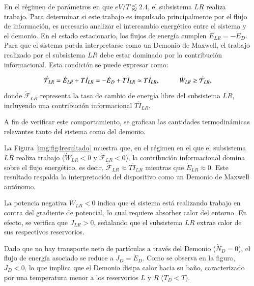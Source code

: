 
En el régimen de parámetros en que \( eV/T \lessapprox 2.4 \), el subsistema \( LR \) realiza trabajo. Para determinar si este trabajo es impulsado principalmente por el flujo de información, es necesario analizar el intercambio energético entre el sistema y el demonio. En el estado estacionario, los flujos de energía cumplen $\dot{E}_{LR}= -\dot{E}_{D}$. Para que el sistema pueda interpretarse como un Demonio de Maxwell, el trabajo realizado por el subsistema \( LR \) debe estar dominado por la contribución informacional. Esta condición se puede expresar como:

\[
\dot{\mathcal{F}}_{LR} = \dot{E}_{LR} + T\dot{I}_{LR} = -\dot{E}_{D} + T\dot{I}_{LR} \approx T\dot{I}_{LR}, \hspace{10mm} \dot{W}_{LR} \geq \dot{\mathcal{F}}_{LR},
\]

donde \( \dot{\mathcal{F}}_{LR} \) representa la tasa de cambio de energía libre del subsistema \( LR \), incluyendo una contribución informacional \( T\dot{I}_{LR} \).

A fin de verificar este comportamiento, se grafican las cantidades termodinámicas relevantes tanto del sistema como del demonio.



La Figura \ref{img:fig4resultado} muestra que, en el régimen en el que el subsistema $LR$ realiza trabajo ($\dot{W}_{LR} < 0$ y $\dot{\mathcal{F}}_{LR} < 0$), la contribución informacional domina sobre el flujo energético, es decir, $\dot{\mathcal{F}}_{LR} \approx T \dot{I}_{LR}$ mientras que $\dot{E}_{LR} \approx 0$. Este resultado respalda la interpretación del dispositivo como un Demonio de Maxwell autónomo.

La potencia negativa $\dot{W}_{LR} < 0$ indica que el sistema está realizando trabajo en contra del gradiente de potencial, lo cual requiere absorber calor del entorno. En efecto, se verifica que $J_{LR} > 0$, señalando que el subsistema $LR$ extrae calor de sus respectivos reservorios.

Dado que no hay transporte neto de partículas a través del Demonio ($\dot{N}_{D} = 0$), el flujo de energía asociado se reduce a $J_{D} = \dot{E}_{D}$. Como se observa en la figura, $J_{D} < 0$, lo que implica que el Demonio disipa calor hacia su baño, caracterizado por una temperatura menor a los reservorios $L$ y $R$ ($T_D < T$). 

